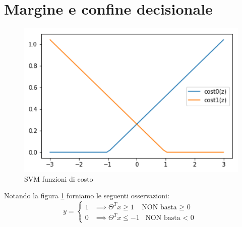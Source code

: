 \section{Margine e confine decisionale}
\begin{figure}[H]
    \centering
    \includegraphics[width=1\textwidth]{img/cost-plots-SVM.png}
    \caption{SVM funzioni di costo}
    \label{Fig:SVMCostPlots}
\end{figure}
Notando la figura \ref{Fig:SVMCostPlots} forniamo le seguenti osservazioni:
  \[y =
    \begin{cases}
      1& \implies \Theta^Tx \geq 1 \,\,\,\mbox{ NON basta $\geq$ 0 }\\
      0& \implies \Theta^Tx \leq -1 \,\,\,\mbox{ NON basta < 0 }
    \end{cases}
  \]
